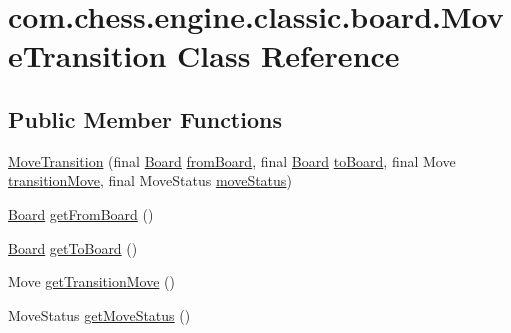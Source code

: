 \hypertarget{classcom_1_1chess_1_1engine_1_1classic_1_1board_1_1_move_transition}{}\section{com.\+chess.\+engine.\+classic.\+board.\+Move\+Transition Class Reference}
\label{classcom_1_1chess_1_1engine_1_1classic_1_1board_1_1_move_transition}
\subsection*{Public Member Functions}
\begin{DoxyCompactItemize}
\item 
\mbox{\hyperlink{classcom_1_1chess_1_1engine_1_1classic_1_1board_1_1_move_transition_a7391960ea30362c621ccc417b65d30a9}{Move\+Transition}} (final \mbox{\hyperlink{classcom_1_1chess_1_1engine_1_1classic_1_1board_1_1_board}{Board}} \mbox{\hyperlink{classcom_1_1chess_1_1engine_1_1classic_1_1board_1_1_move_transition_a99ec04df17243401f6e3a67b0e90c1f6}{from\+Board}}, final \mbox{\hyperlink{classcom_1_1chess_1_1engine_1_1classic_1_1board_1_1_board}{Board}} \mbox{\hyperlink{classcom_1_1chess_1_1engine_1_1classic_1_1board_1_1_move_transition_ace5ea50412538800810ba8f87d7eca83}{to\+Board}}, final Move \mbox{\hyperlink{classcom_1_1chess_1_1engine_1_1classic_1_1board_1_1_move_transition_a830cb2cf536ebd653d409a1449a22ceb}{transition\+Move}}, final Move\+Status \mbox{\hyperlink{classcom_1_1chess_1_1engine_1_1classic_1_1board_1_1_move_transition_a4bbb0266c97363274707853e336d6963}{move\+Status}})
\item 
\mbox{\hyperlink{classcom_1_1chess_1_1engine_1_1classic_1_1board_1_1_board}{Board}} \mbox{\hyperlink{classcom_1_1chess_1_1engine_1_1classic_1_1board_1_1_move_transition_a7980cb4b55650797a8db109b6dd13e2d}{get\+From\+Board}} ()
\item 
\mbox{\hyperlink{classcom_1_1chess_1_1engine_1_1classic_1_1board_1_1_board}{Board}} \mbox{\hyperlink{classcom_1_1chess_1_1engine_1_1classic_1_1board_1_1_move_transition_ad708389e07933de6e6953a588c2cb7f7}{get\+To\+Board}} ()
\item 
Move \mbox{\hyperlink{classcom_1_1chess_1_1engine_1_1classic_1_1board_1_1_move_transition_a58dc3cbf3273a01b759ba656cc85a064}{get\+Transition\+Move}} ()
\item 
Move\+Status \mbox{\hyperlink{classcom_1_1chess_1_1engine_1_1classic_1_1board_1_1_move_transition_a67e8f4558a0cbc898cffe388d73d7b4b}{get\+Move\+Status}} ()
\end{DoxyCompactItemize}

